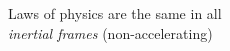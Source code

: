 \documentclass[preview]{standalone}
\begin{document}
\begin{center}
Laws of physics are the same in all \\\emph{inertial frames} (non-accelerating)
\end{center}
\end{document}
